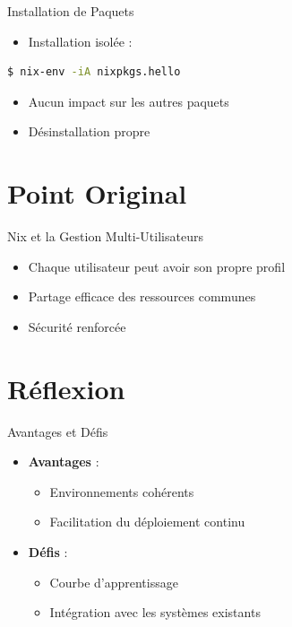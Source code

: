 \documentclass{beamer}
\begin{document}
    




\begin{frame}[fragile]{Installation de Paquets}
	\begin{itemize}
		\item Installation isolée :
	\end{itemize}
	\begin{lstlisting}[language=bash]
$ nix-env -iA nixpkgs.hello
    \end{lstlisting}
	\begin{itemize}
		\item Aucun impact sur les autres paquets
		\item Désinstallation propre
	\end{itemize}
\end{frame}

\section{Point Original}

\begin{frame}{Nix et la Gestion Multi-Utilisateurs}
	\begin{itemize}
		\item Chaque utilisateur peut avoir son propre profil
		\item Partage efficace des ressources communes
		\item Sécurité renforcée
	\end{itemize}
\end{frame}

\section{Réflexion}

\begin{frame}{Avantages et Défis}
	\begin{itemize}
		\item \textbf{Avantages} :
		      \begin{itemize}
			      \item Environnements cohérents
			      \item Facilitation du déploiement continu
		      \end{itemize}
		\item \textbf{Défis} :
		      \begin{itemize}
			      \item Courbe d'apprentissage
			      \item Intégration avec les systèmes existants
		      \end{itemize}
	\end{itemize}
\end{frame}
\end{document}
